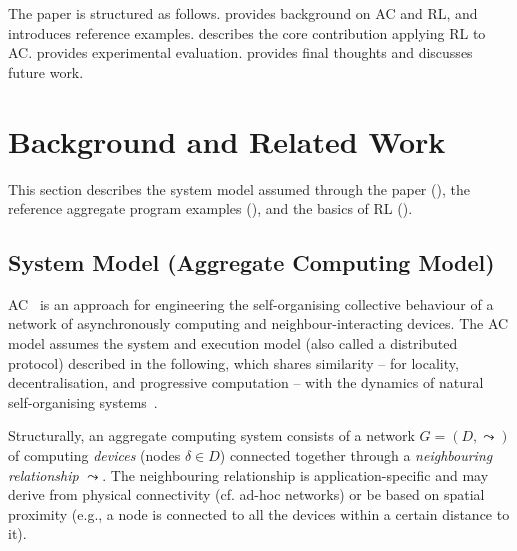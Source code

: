 The paper is structured as follows.
%
 provides background on \ac{AC} and \ac{RL}, and introduces reference examples. 
%
 describes the core contribution applying \ac{RL} to \ac{AC}. %
%
 provides experimental evaluation. %
%
 provides final thoughts and discusses future work.

\section{Background and Related Work}
\label{sec:background}

This section
 describes the system model
 assumed through the paper (),
 the reference aggregate program examples
 (),
 and the basics of \ac{RL}
 ().

\subsection{System Model (Aggregate Computing Model)}\label{s:background:ac}

\ac{AC}~\cite{DBLP:journals/computer/BealPV15,DBLP:journals/jlap/ViroliBDACP19}
 is an approach 
 for engineering the self-organising collective behaviour
 of a network of asynchronously computing and neighbour-interacting devices.
%
The \ac{AC} model 
 assumes the system and execution model (also called a distributed protocol) described in the following,
 which shares similarity -- for locality, decentralisation, and progressive computation -- with the dynamics of natural self-organising systems~\cite{bonabeau1999swarm-intelligence}.
%

\newcommand{\neigh}{\ensuremath{\leadsto}}
\newcommand{\deviceId}{\ensuremath{\delta}}

Structurally, an aggregate computing system consists of a network $G=(D,\neigh)$ of computing \emph{devices} (nodes $\deviceId \in D$)
 connected together through a \emph{neighbouring relationship} $\neigh$.
%
The neighbouring relationship is application-specific
 and may derive 
 from physical connectivity (cf. ad-hoc networks)
 or 
 be based on spatial proximity (e.g., a node is connected to all the devices within a certain distance to it).

